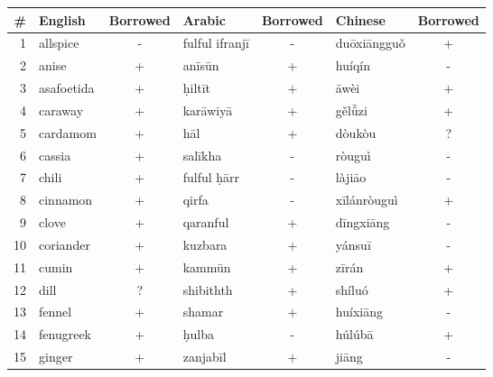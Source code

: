 \begin{table}[h]
    \begin{tabular}{@{}rlclclc@{}}
    \toprule
    \textbf{\#} & \textbf{English} & \textbf{Borrowed} & \textbf{Arabic}  & \textbf{Borrowed} & \textbf{Chinese} & \textbf{Borrowed} \\ \midrule
    1           & allspice         & -           & fulful ifranjī   & -           & duōxiāngguǒ      & +           \\
    2           & anise            & +           & anīsūn           & +           & huíqín           & -           \\
    3           & asafoetida       & +           & ḥiltīt           & +           & āwèi             & +           \\
    4           & caraway          & +           & karāwiyā         & +           & gělǚzi         & +           \\
    5           & cardamom         & +           & hāl              & +           & dòukòu           & ?           \\
    6           & cassia           & +           & salīkha          & -           & ròuguì           & -           \\
    7           & chili            & +           & fulful ḥārr      & -           & làjiāo           & -           \\
    8           & cinnamon         & +           & qirfa            & -           & xīlánròuguì      & +           \\
    9           & clove            & +           & qaranful         & +           & dīngxiāng        & -           \\
    10          & coriander        & +           & kuzbara          & +           & yánsuī           & -           \\
    11          & cumin            & +           & kammūn           & +           & zīrán            & +           \\
    12          & dill             & ?           & shibithth        & +           & shíluó           & +           \\
    13          & fennel           & +           & shamar           & +           & huíxiāng         & -           \\
    14          & fenugreek        & +           & ḥulba            & -           & húlúbā           & +           \\
    15          & ginger           & +           & zanjabīl         & +           & jiāng            & -           \\

\end{tabular}
\end{table}
